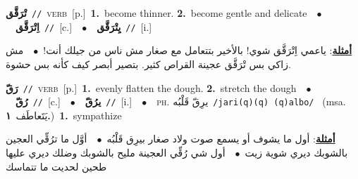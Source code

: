 \documentclass[10pt,a4paper,twoside]{article} %
\begin{document}
\begin{multicols}{2}
{\setlength\topsep{0pt}\textbf{\foreignlanguage{arabic}{تْرَقَّق}}\ {\color{gray}\texttt{//}\color{black}}\ \textsc{verb}\ [p.]\ \textbf{1.}~become thinner.  \textbf{2.}~become gentle and delicate\ \ $\bullet$\ \ \setlength\topsep{0pt}\textbf{\foreignlanguage{arabic}{اِتْرَقَّق}}\ {\color{gray}\texttt{//}\color{black}}\ [c.]\ \ $\bullet$\ \ \setlength\topsep{0pt}\textbf{\foreignlanguage{arabic}{يِتْرَقَّق}}\ {\color{gray}\texttt{//}\color{black}}\ [i.]\  \begin{flushright}\color{gray}\foreignlanguage{arabic}{\textbf{\underline{\foreignlanguage{arabic}{أمثلة}}}: ياعمي اِتْرَقَّق شوي! بالأخير بتتعامل مع صغار مش ناس من جيلك أنت!\ $\bullet$\ \  مش زاكي بس تْرَقَّق عجينة القراص كثير. بتصير أبصر كيف كأنه بس حشوة.}\end{flushright}\color{black}} \vspace{2mm}

{\setlength\topsep{0pt}\textbf{\foreignlanguage{arabic}{رَقّ}}\ {\color{gray}\texttt{//}\color{black}}\ \textsc{verb}\ [p.]\ \textbf{1.}~evenly flatten the dough.  \textbf{2.}~stretch the dough\ \ $\bullet$\ \ \setlength\topsep{0pt}\textbf{\foreignlanguage{arabic}{رُقّ}}\ {\color{gray}\texttt{//}\color{black}}\ [c.]\ \ $\bullet$\ \ \setlength\topsep{0pt}\textbf{\foreignlanguage{arabic}{يرُقّ}}\ {\color{gray}\texttt{//}\color{black}}\ [i.]\ \ $\bullet$\ \ \textsc{ph.} \color{gray} \foreignlanguage{arabic}{يرِقّ قَلْبُه}\color{black}\ {\color{gray}\texttt{/{\sffamily jari(q)(q) (q)albo}/}\color{black}}\ \color{gray} (msa. \foreignlanguage{arabic}{يَتَعاطَف}~\foreignlanguage{arabic}{\textbf{١.}})\color{black}\ \textbf{1.}~sympathize\  \begin{flushright}\color{gray}\foreignlanguage{arabic}{\textbf{\underline{\foreignlanguage{arabic}{أمثلة}}}: أول ما يشوف أو يسمع صوت ولاد صغار بيرِق قَلْبُه\ $\bullet$\ \  أوَّل ما ترُقِّي العجين بالشوبك ديري شوية زيت\ $\bullet$\ \  أول شي رُقِّي العجينة مليح بالشوبك وضلك ديري عليها طحين لحديت ما تتماسك}\end{flushright}\color{black}} \vspace{2mm}


\end{multicols}
\end{document}
